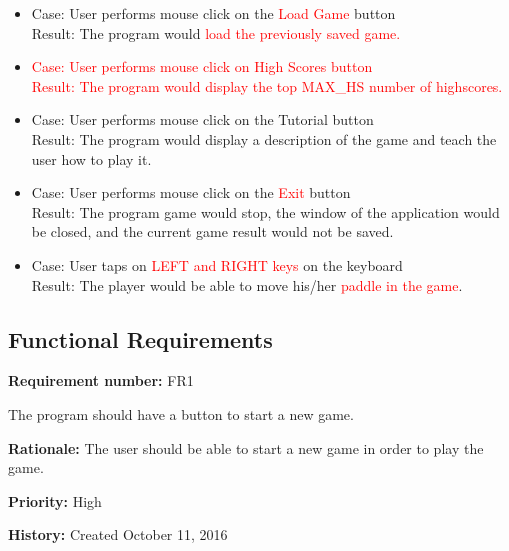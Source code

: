 \documentclass[12pt,letterpaper]{article}
\begin{document}
\begin{itemize}
	\item Case: User performs mouse click on the \textcolor{red}{Load Game} button\\
	Result: The program would \textcolor{red}{load the previously saved game.}\\

	\item \textcolor{red}{Case: User performs mouse click on High Scores button}\\
	\textcolor{red}{Result: The program would display the top MAX_HS number of highscores.}\\

	\item Case: User performs mouse click on the Tutorial button\\
	Result: The program would display a description of the game and teach the user how to play it.\\

	\item Case: User performs mouse click on the \textcolor{red}{Exit} button\\
	Result: The program game would stop, the window of the application would be closed, and the current game result would not be saved.\\

	\item Case: User taps on \textcolor{red}{ LEFT and RIGHT keys} on the keyboard\\
	Result: The player would be able to move his/her \textcolor{red}{paddle in the game}.\\
\end{itemize}

	\subsection{Functional Requirements}

\begin{reqbox}
	\begin{itemize}
		\textbf{Requirement number: }FR1  
		
		The program should have a button to start a new game.  
		 
		\textbf{Rationale: } The user should be able to start a new game in order to play the game.
		
		\textbf{Priority: }High

		\textbf{History: }Created October 11, 2016
	\end{itemize}
\end{reqbox}
\end{document}
